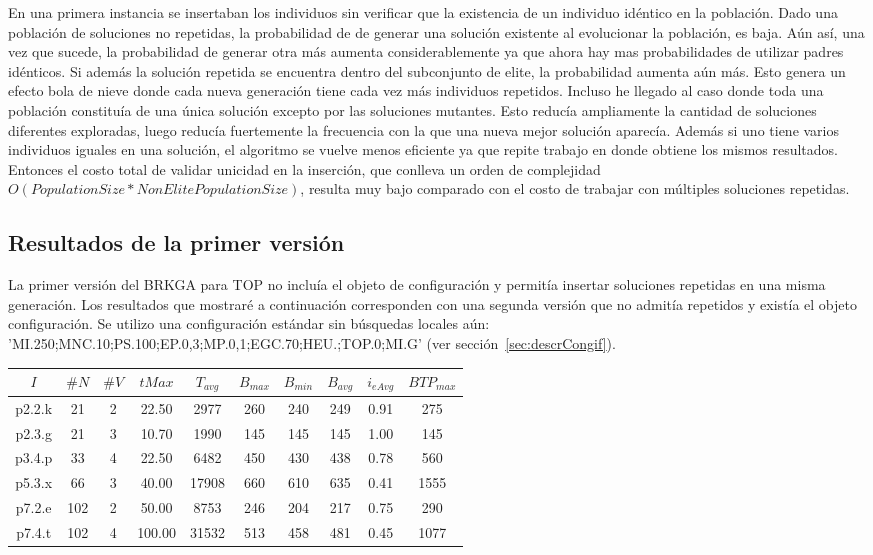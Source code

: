 En una primera instancia se insertaban los individuos sin verificar que la existencia de un individuo idéntico en la población. Dado una población de soluciones no repetidas, la probabilidad de de generar una solución existente al evolucionar la población, es baja. Aún así, una vez que sucede, la probabilidad de generar otra más aumenta considerablemente ya que ahora hay mas probabilidades de utilizar padres idénticos. Si además la solución repetida se encuentra dentro del subconjunto de elite, la probabilidad aumenta aún más. Esto genera un efecto bola de nieve donde cada nueva generación tiene cada vez más individuos repetidos. Incluso he llegado al caso donde toda una población constituía de una única solución excepto por las soluciones mutantes. Esto reducía ampliamente la cantidad de soluciones diferentes exploradas, luego reducía fuertemente la frecuencia con la que una nueva mejor solución aparecía. Además si uno tiene varios individuos iguales en una solución, el algoritmo se vuelve menos eficiente ya que repite trabajo en donde obtiene los mismos resultados. Entonces el costo total de validar unicidad en la inserción, que conlleva un orden de complejidad $O(PopulationSize * NonElitePopulationSize)$, resulta muy bajo comparado con el costo de trabajar con múltiples soluciones repetidas.

\subsection{Resultados de la primer versión}

La primer versión del BRKGA para TOP no incluía el objeto de configuración y permitía insertar soluciones repetidas en una misma generación. Los resultados que mostraré a continuación corresponden con una segunda versión que no admitía repetidos y existía el objeto configuración. Se utilizo una configuración estándar sin búsquedas locales aún: 
\\ 'MI.250;MNC.10;PS.100;EP.0,3;MP.0,1;EGC.70;HEU.;TOP.0;MI.G' (ver sección~\ref{sec:descrCongif}).

\bigskip

\begin{center}
\begin{tabular}{ |c|c|c|c|c|c|c|c|c|c| } 
 \hline
$I$ & $\#N$ & $\#V$ & $tMax$ & $T_{avg}$ & $B_{max}$ & $B_{min}$ & $B_{avg}$ & $i_{eAvg}$ & $BTP_{max}$ \\
\hline
p2.2.k & 21 & 2 & 22.50 & 2977 & 260 & 240 & 249 & 0.91 & 275  \\
p2.3.g & 21 & 3 & 10.70 & 1990 & 145 & 145 & 145 & 1.00 & 145  \\
p3.4.p & 33 & 4 & 22.50 & 6482 & 450 & 430 & 438 & 0.78 & 560  \\
p5.3.x & 66 & 3 & 40.00 & 17908 & 660 & 610 & 635 & 0.41 & 1555  \\
p7.2.e & 102 & 2 & 50.00 & 8753 & 246 & 204 & 217 & 0.75 & 290  \\
p7.4.t & 102 & 4 & 100.00 & 31532 & 513 & 458 & 481 & 0.45 & 1077  \\
\hline
\end{tabular}
\end{center}


